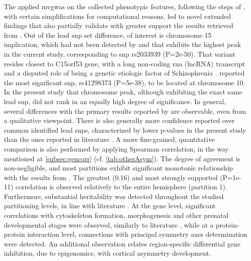 The applied \ac{mvgwas} on the collected phenotypic features, following the steps of \citet{Naqvi2021}, with certain simplifications for computational reasons, led to novel extended findings that also partially validate with greater support the results retrieved from \citet{Sha2021}. Out of the lead \ac{snp} set difference, of interest is chromosome 15 implication, which had not been detected by \citet{Sha2021} and that exhibits the highest peak in the current study, corresponding to \ac{snp} rs2033939 (P=2e-50). That variant resides closest to C15orf53 gene, with a long non-coding \ac{rna} (lncRNA) transcript and a disputed role of being a genetic etiologic factor of Schizophrenia \cite{Kranz2012}. \citet{Sha2021} reported the most significant \ac{snp}, rs41298373 (P=5e-38), to be located at chromosome 10. In the present study that chromosome peak, although exhibiting the exact same lead \ac{snp}, did not rank in an equally high degree of significance. In general, several differences with the primary results reported by \citet{Sha2021} are observable, even from a qualitative viewpoint. There is also generally more confidence reported over common identified lead \acp{snp}, characterized by lower p-values in the present study than the ones reported in literature \cite{Sha2021}. A more fine-grained, quantitative comparison is also performed by applying Spearman correlation, in the way mentioned at \autoref{subsec:gencorr} \cite{Naqvi2021} (cf. \autoref{tab:otherAsym}). The degree of agreement is non-negligible, and most partitions exhibit significant monotonic relationship with the results from \citet{Sha2021}. The greatest (0.16) and most strongly supported (P=1e-11) correlation is observed relatively to the entire hemisphere (partition 1). Furthermore, substantial heritability was detected throughout the studied partitioning levels, in line with literature \cite{Sha2021}. At the gene level, significant correlations with cytoskeleton formation, morphogenesis and other prenatal developmental stages were observed, similarly to literature \cite{Sha2021}, while at a protein-protein interaction level, connections with principal symmetry axes determination were detected. An additional observation relates region-specific differential gene inhibition, due to epigenomics, with cortical asymmetry development.

